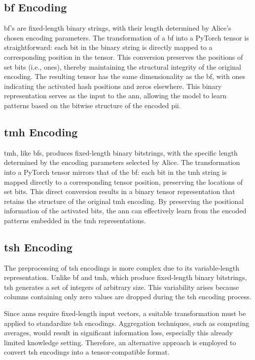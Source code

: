 \subsection{\ac{bf} Encoding}

\ac{bf}'s are fixed-length binary strings, with their length determined by Alice’s chosen encoding parameters.
The transformation of a \ac{bf} into a PyTorch tensor is straightforward: each bit in the binary string is directly mapped to a corresponding position in the tensor.
This conversion preserves the positions of set bits (i.e., ones), thereby maintaining the structural integrity of the original encoding.
The resulting tensor has the same dimensionality as the \ac{bf}, with ones indicating the activated hash positions and zeros elsewhere.
This binary representation serves as the input to the \ac{ann}, allowing the model to learn patterns based on the bitwise structure of the encoded \ac{pii}.

\subsection{\ac{tmh} Encoding}

\ac{tmh}, like \acp{bf}, produces fixed-length binary bitstrings, with the specific length determined by the encoding parameters selected by Alice.
The transformation into a PyTorch tensor mirrors that of the \ac{bf}: each bit in the \ac{tmh} string is mapped directly to a corresponding tensor position, preserving the locations of set bits.
This direct conversion results in a binary tensor representation that retains the structure of the original \ac{tmh} encoding.
By preserving the positional information of the activated bits, the \ac{ann} can effectively learn from the encoded patterns embedded in the \ac{tmh} representations.

\subsection{\ac{tsh} Encoding}

The preprocessing of \ac{tsh} encodings is more complex due to its variable-length representation.
Unlike \ac{bf} and \ac{tmh}, which produce fixed-length binary bitstrings, \ac{tsh} generates a set of integers of arbitrary size.
This variability arises because columns containing only zero values are dropped during the \ac{tsh} encoding process.

Since \acp{ann} require fixed-length input vectors, a suitable transformation must be applied to standardize \ac{tsh} encodings.
Aggregation techniques, such as computing averages, would result in significant information loss, especially this already limited knowledge setting.
Therefore, an alternative approach is employed to convert \ac{tsh} encodings into a tensor-compatible format.

